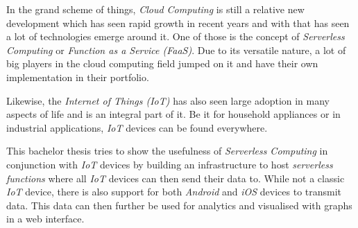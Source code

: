 In the grand scheme of things, \textit{Cloud Computing} is still a relative new development which
has seen rapid growth in recent years and with that has seen a lot of technologies emerge around it.
One of those is the concept of \textit{Serverless Computing} or \textit{Function as a Service
(FaaS)}. Due to its versatile nature, a lot of big players in the cloud computing field jumped on it
and have their own implementation in their portfolio.

Likewise, the \textit{Internet of Things (IoT)} has also seen large adoption in many aspects of life
and is an integral part of it. Be it for household appliances or in industrial applications,
\textit{IoT} devices can be found everywhere.

This bachelor thesis tries to show the usefulness of \textit{Serverless Computing} in conjunction
with \textit{IoT} devices by building an infrastructure to host \textit{serverless functions} where
all \textit{IoT} devices can then send their data to. While not a classic \textit{IoT} device, there
is also support for both \textit{Android} and \textit{iOS} devices to transmit data. This data can
then further be used for analytics and visualised with graphs in a web interface.
